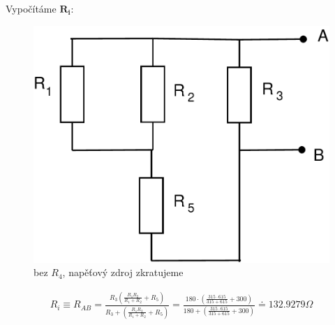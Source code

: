 \documentclass[12pt,a4paper]{article}
\begin{document}
	Vypočítáme $\boldsymbol{R_i}$:
	\begin{figure}[H]
		\center\includegraphics[width=0.5\linewidth]{obr/2_2}
		\caption*{bez $R_4$, napěťový zdroj zkratujeme}
	\end{figure}
	\begin{gather*}
		R_i \equiv R_{AB} = \frac{R_3 (\frac{R_1 R_2}{R_1 + R_2} + R_5)}{R_3 + (\frac{R_1 R_2}{R_1 + R_2} + R_5)} =
		\frac{180 \cdot (\frac{315 \cdot 615}{315 + 615} + 300)}{180 + (\frac{315 \cdot 615}{315 + 615} + 300)} \doteq 132.9279 \Omega
	\end{gather*}
\end{document}
